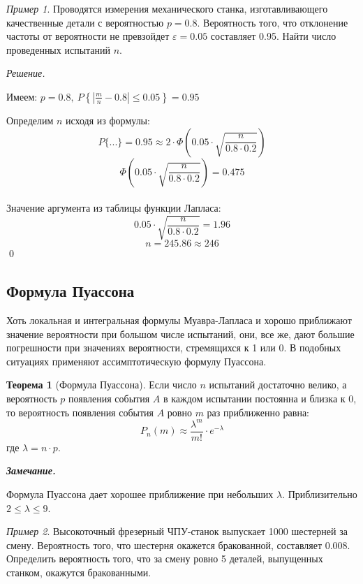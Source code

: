 \documentclass[12pt,a4paper]{article}
\theoremstyle{definition}
\theoremstyle{definition}
\newtheorem{theorem}{Теорема}[section]
\theoremstyle{remark}
\newenvironment{remark}{
  \par\noindent\textbf{\textit{Замечание.}}~
}{\par}
\theoremstyle{corollary}
\theoremstyle{bolditalic}
\newtheorem{example}{Пример}[section]
\newenvironment{solution}{
    \vspace{0.5em}
    \noindent\textit{Решение.}
}{\qed\vspace{1em}}
\begin{document}
\begin{example}
    Проводятся измерения механического станка, изготавливающего качественные детали с вероятностью $p=0.8$. Вероятность того, что отклонение частоты от вероятности не превзойдет $\varepsilon=0.05$ составляет 0.95. Найти число проведенных испытаний $n$.
\end{example}

\begin{solution}
    Имеем: $p=0.8,\ P\left\{\left|\frac{m}{n} - 0.8\right| \le 0.05 \right\}=0.95$

    Определим $n$ исходя из формулы:
    \[
    P\{...\}=0.95\approx2\cdot \Phi\left( 0.05 \cdot \sqrt{\frac{n}{0.8\cdot0.2}}\right)
    \]
    \[
    \Phi\left( 0.05 \cdot \sqrt{\frac{n}{0.8\cdot0.2}}\right)=0.475
    \]
    \\
    Значение аргумента из таблицы функции Лапласа:
    \[
     0.05 \cdot \sqrt{\frac{n}{0.8\cdot0.2}}=1.96
    \]
    \[
    n=245.86\approx 246
    \]
\end{solution}

\subsection{Формула Пуассона}

Хоть локальная и интегральная формулы Муавра-Лапласа и хорошо приближают значение вероятности при большом числе испытаний, они, все же, дают большие погрешности при значениях вероятности, стремящихся к 1 или 0. В подобных ситуациях применяют ассимптотическую формулу Пуассона. 

\begin{theorem}[Формула Пуассона]
    Если число $n$ испытаний достаточно велико, а вероятность $p$ появления события $A$ в каждом испытании постоянна и близка к 0, то вероятность появления события $A$ ровно $m$ раз приближенно равна:
    \[
    P_n(m) \approx \frac{\lambda^m}{m!}\cdot e^{-\lambda}
    \]
    где $\lambda=n\cdot p$.
\end{theorem}

\begin{remark}
    Формула Пуассона дает хорошее приближение при небольших $\lambda$. Приблизительно $2 \le \lambda \le 9$.
\end{remark}

\begin{example}
    Высокоточный фрезерный ЧПУ-станок выпускает 1000 шестерней за смену. Вероятность того, что шестерня окажется бракованной, составляет 0.008. Определить вероятность того, что за смену ровно 5 деталей, выпущенных станком, окажутся бракованными.
\end{example}
\end{document}
